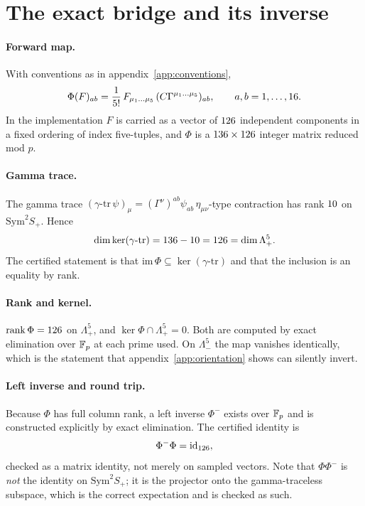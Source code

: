 \section{The exact bridge and its inverse}
\label{app:bridge-exact}

\paragraph{Forward map.}
With conventions as in appendix~\ref{app:conventions},
\begin{equation}
\Phi(F)_{ab} = \frac{1}{5!}\,F_{\mu_1\dots\mu_5}\,
              (C\Gamma^{\mu_1\dots\mu_5})_{ab},
\qquad a,b = 1,\dots,16 .
\end{equation}
In the implementation $F$ is carried as a vector of $126$
independent components in a fixed ordering of index five-tuples, and $\Phi$ is a
$136 \times 126$ integer matrix reduced mod $p$.

\paragraph{Gamma trace.}
The gamma trace $(\gamma\text{-}\mathrm{tr}\,\psi)_\mu
 = (\Gamma^\nu)^{ab}\psi_{ab}\,\eta_{\mu\nu}$-type contraction has rank
$10$ on $\mathrm{Sym}^2 S_+$. Hence
\begin{equation}
\dim \ker(\gamma\text{-}\mathrm{tr})
 = 136 - 10
 = 126
 = \dim \Lambda^5_+ .
\end{equation}
The certified statement is that $\mathrm{im}\,\Phi \subseteq
\ker(\gamma\text{-}\mathrm{tr})$ and that the inclusion is an equality by rank.

\paragraph{Rank and kernel.}
$\mathrm{rank}\,\Phi = 126$ on $\Lambda^5_+$, and
$\ker \Phi \cap \Lambda^5_+ = 0$. Both are computed by exact elimination over
$\mathbb{F}_p$ at each prime used. On $\Lambda^5_-$ the map vanishes identically, which is
the statement that appendix~\ref{app:orientation} shows can silently invert.

\paragraph{Left inverse and round trip.}
Because $\Phi$ has full column rank, a left inverse $\Phi^-$ exists over $\mathbb{F}_p$
and is constructed explicitly by exact elimination. The certified identity is
\begin{equation}
\Phi^- \Phi = \mathrm{id}_{126},
\end{equation}
checked as a matrix identity, not merely on sampled vectors. Note that
$\Phi\Phi^-$ is \emph{not} the identity on $\mathrm{Sym}^2 S_+$; it is the
projector onto the gamma-traceless subspace, which is the correct expectation and
is checked as such.

